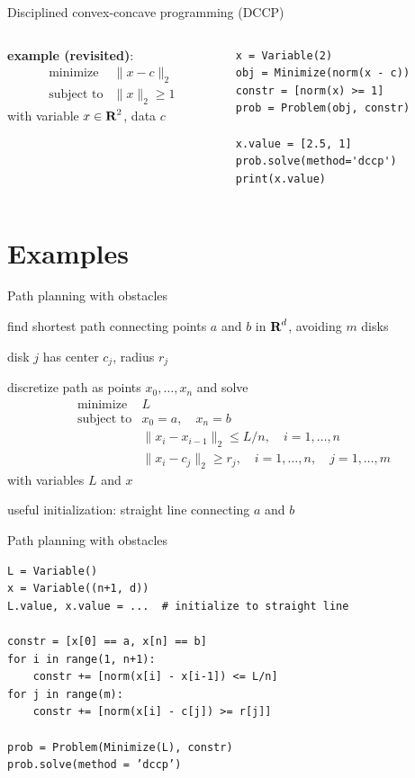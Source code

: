 \documentclass[aspectratio=169,11pt]{beamer}
\begin{document}
\begin{frame}[fragile]{Disciplined convex-concave programming (DCCP)}
\begin{columns}
\begin{column}{0.5\textwidth}
\BIT
\item \textbf{example (revisited)}:
\[
\begin{array}{ll}
\mbox{minimize} & \|x - c\|_2 \\
\mbox{subject to} & \|x\|_2 \geq 1
\end{array}
\]
with variable $x \in {\mbox{\bfseries\rmfamily R}}^2$, data $c$
\EIT
\end{column}
\begin{column}{0.5\textwidth}
\begin{verbatim}
x = Variable(2)
obj = Minimize(norm(x - c))
constr = [norm(x) >= 1]
prob = Problem(obj, constr)

x.value = [2.5, 1]
prob.solve(method='dccp')
print(x.value)
\end{verbatim}
\end{column}
\end{columns}
\end{frame}

\section{Examples}

\begin{frame}{Path planning with obstacles}
\BIT
\item find shortest path connecting points $a$ and $b$ in ${\mbox{\bfseries\rmfamily R}}^d$,
avoiding $m$ disks
\item disk $j$ has center $c_j$, radius $r_j$
\item discretize path as points $x_0, \ldots, x_n$ and solve
\[
\begin{array}{ll}
\mbox{minimize} & L\\
\mbox{subject to} &x_0 = a, \quad x_n = b\\
& \|x_i - x_{i-1}\|_2 \leq L/n, \quad i = 1, \ldots, n\\
& \|x_i - c_j\|_2 \geq r_j, \quad i = 1, \ldots, n, \quad j = 1, \ldots, m
\end{array}
\]
with variables $L$ and $x$
\item useful initialization: straight line connecting $a$ and $b$
\EIT
\end{frame}

\begin{frame}[fragile]{Path planning with obstacles}
\begin{verbatim}
L = Variable()
x = Variable((n+1, d))
L.value, x.value = ...  # initialize to straight line

constr = [x[0] == a, x[n] == b]
for i in range(1, n+1):
    constr += [norm(x[i] - x[i-1]) <= L/n]
for j in range(m):
    constr += [norm(x[i] - c[j]) >= r[j]]

prob = Problem(Minimize(L), constr)
prob.solve(method = ’dccp’)
\end{verbatim}
\end{frame}
\end{document}
